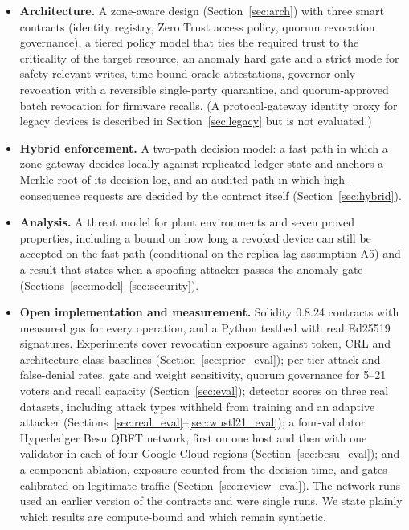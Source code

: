 \begin{itemize}[leftmargin=1.1em,itemsep=0pt,topsep=1pt]
  \item \textbf{Architecture.} A zone-aware design (Section~\ref{sec:arch}) with three smart contracts (identity registry, Zero Trust access policy, quorum revocation governance), a tiered policy model that ties the required trust to the criticality of the target resource, an anomaly hard gate and a strict mode for safety-relevant writes, time-bound oracle attestations, governor-only revocation with a reversible single-party quarantine, and quorum-approved batch revocation for firmware recalls. (A protocol-gateway identity proxy for legacy devices is described in Section~\ref{sec:legacy} but is not evaluated.)
  \item \textbf{Hybrid enforcement.} A two-path decision model: a fast path in which a zone gateway decides locally against replicated ledger state and anchors a Merkle root of its decision log, and an audited path in which high-consequence requests are decided by the contract itself (Section~\ref{sec:hybrid}).
  \item \textbf{Analysis.} A threat model for plant environments and seven proved properties, including a bound on how long a revoked device can still be accepted on the fast path (conditional on the replica-lag assumption A5) and a result that states when a spoofing attacker passes the anomaly gate (Sections~\ref{sec:model}--\ref{sec:security}).
  \item \textbf{Open implementation and measurement.} Solidity 0.8.24 contracts with measured gas for every operation, and a Python testbed with real Ed25519 signatures. Experiments cover revocation exposure against token, CRL and architecture-class baselines (Section~\ref{sec:prior_eval}); per-tier attack and false-denial rates, gate and weight sensitivity, quorum governance for 5--21 voters and recall capacity (Section~\ref{sec:eval}); detector scores on three real datasets, including attack types withheld from training and an adaptive attacker (Sections~\ref{sec:real_eval}--\ref{sec:wustl21_eval}); a four-validator Hyperledger Besu QBFT network, first on one host and then with one validator in each of four Google Cloud regions (Section~\ref{sec:besu_eval}); and a component ablation, exposure counted from the decision time, and gates calibrated on legitimate traffic (Section~\ref{sec:review_eval}). The network runs used an earlier version of the contracts and were single runs. We state plainly which results are compute-bound and which remain synthetic.
\end{itemize}
